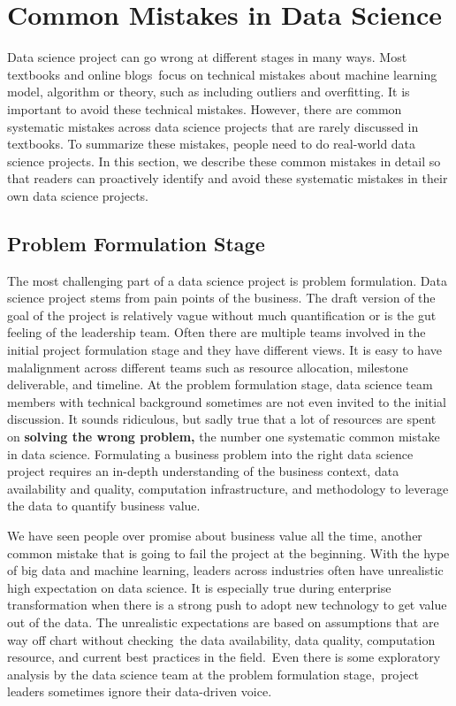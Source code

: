 \documentclass[12pt,]{krantz}
\theoremstyle{definition}
\theoremstyle{definition}
\theoremstyle{definition}
\theoremstyle{remark}
\begin{document}
\section{Common Mistakes in Data
Science}\label{common-mistakes-in-data-science}

Data science project can go wrong at different stages in many ways. Most
textbooks and online blogs~focus on technical mistakes about machine
learning model, algorithm or theory, such as including outliers and
overfitting. It is important to avoid these technical mistakes. However,
there are common systematic mistakes across data science projects that
are rarely discussed in textbooks. To summarize these mistakes, people
need to do real-world data science projects. In this section, we
describe these common mistakes in detail so that readers can proactively
identify and avoid these systematic mistakes in their own data science
projects.

\subsection{Problem Formulation Stage}\label{problem-formulation-stage}

The most challenging part of a data science project is problem
formulation. Data science project stems from pain points of the
business. The draft version of the goal of the project is relatively
vague without much quantification or is the gut feeling of the
leadership team. Often there are multiple teams involved in the initial
project formulation stage and they have different views. It is easy to
have malalignment across different teams such as resource allocation,
milestone deliverable, and timeline. At the problem formulation stage,
data science team members with technical background sometimes are not
even invited to the initial discussion. It sounds ridiculous, but sadly
true that a lot of resources are spent on \textbf{solving the wrong
problem,} the number one systematic common mistake in data science.
Formulating a business problem into the right data science project
requires an in-depth understanding of the business context, data
availability and quality, computation infrastructure, and methodology to
leverage the data to quantify business value.

We have seen people over promise about business value all the time,
another common mistake that is going to fail the project at the
beginning. With the hype of big data and machine learning, leaders
across industries often have unrealistic high expectation on data
science. It is especially true during enterprise transformation when
there is a strong push to adopt new technology to get value out of the
data. The unrealistic expectations are based on assumptions that are way
off chart without checking~the data availability, data quality,
computation resource, and current best practices in the field.~Even
there is some exploratory analysis by the data science team at the
problem formulation stage,~project leaders sometimes ignore their
data-driven voice.
\end{document}
